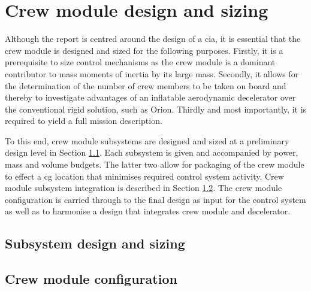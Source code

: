 \section{Crew module design and sizing}\label{ch:crewmod}
Although the report is centred around the design of a \acrfull{cia}, it is essential that the crew module is designed and sized for the following purposes. Firstly, it is a prerequisite to size control mechanisms as the crew module is a dominant contributor to mass moments of inertia by its large mass. Secondly, it allows for the determination of the number of crew members to be taken on board and thereby to investigate advantages of an inflatable aerodynamic decelerator over the conventional rigid solution, such as Orion. Thirdly and most importantly, it is required to yield a full mission description.

To this end, crew module subsystems are designed and sized at a preliminary design level in Section \ref{sec:crewsubsys}. Each subsystem is given and accompanied by power, mass and volume budgets. The latter two allow for packaging of the crew module to effect a \gls{cg} location that minimises required control system activity. Crew module subsystem integration is described in Section \ref{sec:crewpackaging}. The crew module configuration is carried through to the final design as input for the control system as well as to harmonise a design that integrates crew module and decelerator.

\subsection{Subsystem design and sizing} \label{sec:crewsubsys}


\subsection{Crew module configuration} \label{sec:crewpackaging}


